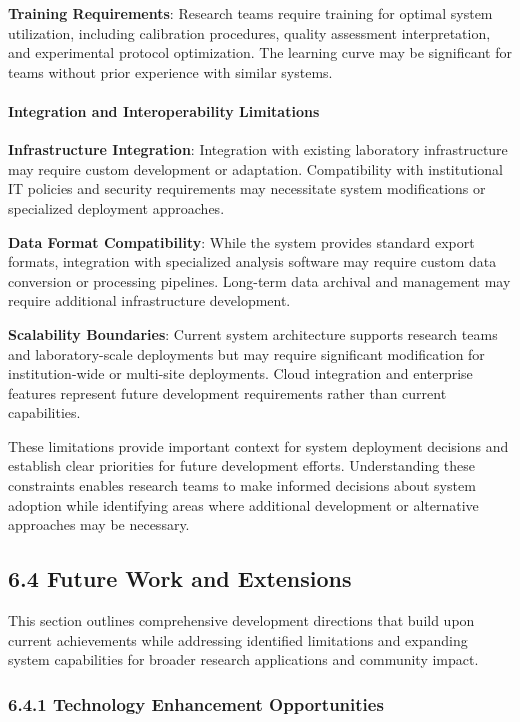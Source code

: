 \documentclass[11pt,a4paper]{article}
\begin{document}
\textbf{Training Requirements}: Research teams require training for optimal system utilization, including calibration
procedures, quality assessment interpretation, and experimental protocol optimization. The learning curve may be
significant for teams without prior experience with similar systems.

\paragraph{Integration and Interoperability Limitations}

\textbf{Infrastructure Integration}: Integration with existing laboratory infrastructure may require custom development or
adaptation. Compatibility with institutional IT policies and security requirements may necessitate system modifications
or specialized deployment approaches.

\textbf{Data Format Compatibility}: While the system provides standard export formats, integration with specialized analysis
software may require custom data conversion or processing pipelines. Long-term data archival and management may require
additional infrastructure development.

\textbf{Scalability Boundaries}: Current system architecture supports research teams and laboratory-scale deployments but may
require significant modification for institution-wide or multi-site deployments. Cloud integration and enterprise
features represent future development requirements rather than current capabilities.

These limitations provide important context for system deployment decisions and establish clear priorities for future
development efforts. Understanding these constraints enables research teams to make informed decisions about system
adoption while identifying areas where additional development or alternative approaches may be necessary.

\subsection{6.4 Future Work and Extensions}

This section outlines comprehensive development directions that build upon current achievements while addressing
identified limitations and expanding system capabilities for broader research applications and community impact.

\subsubsection{6.4.1 Technology Enhancement Opportunities}
\end{document}
